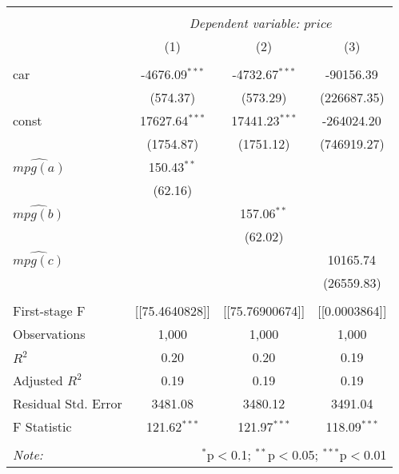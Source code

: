 \begin{table}[!htbp] \centering
\begin{tabular}{@{\extracolsep{5pt}}lccc}
\\[-1.8ex]\hline
\hline \\[-1.8ex]
& \multicolumn{3}{c}{\textit{Dependent variable: $price$}} \
\cr \cline{3-4}
\\[-1.8ex] & (1) & (2) & (3) \\
\hline \\[-1.8ex]
 car & -4676.09$^{***}$ & -4732.67$^{***}$ & -90156.39$^{}$ \\
  & (574.37) & (573.29) & (226687.35) \\
 const & 17627.64$^{***}$ & 17441.23$^{***}$ & -264024.20$^{}$ \\
  & (1754.87) & (1751.12) & (746919.27) \\
 $\hat{mpg(a)}$ & 150.43$^{**}$ & & \\
  & (62.16) & & \\
 $\hat{mpg(b)}$ & & 157.06$^{**}$ & \\
  & & (62.02) & \\
 $\hat{mpg(c)}$ & & & 10165.74$^{}$ \\
  & & & (26559.83) \\
\hline \\[-1.8ex]
 First-stage F & [[75.4640828]] & [[75.76900674]] & [[0.0003864]] \\
 Observations & 1,000 & 1,000 & 1,000 \\
 $R^2$ & 0.20 & 0.20 & 0.19 \\
 Adjusted $R^2$ & 0.19 & 0.19 & 0.19 \\
 Residual Std. Error & 3481.08 & 3480.12 & 3491.04  \\
 F Statistic & 121.62$^{***}$  & 121.97$^{***}$  & 118.09$^{***}$  \\
\hline
\hline \\[-1.8ex]
\textit{Note:} & \multicolumn{3}{r}{$^{*}$p$<$0.1; $^{**}$p$<$0.05; $^{***}$p$<$0.01} \\
\end{tabular}
\end{table}